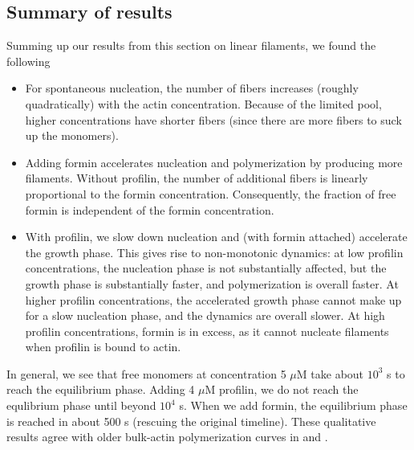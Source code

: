 \documentclass[11pt]{article}
\begin{document}
\iffalse
\begin{figure}
\centering
\texttt{[image: FreeMonConcForminLowProf.eps]}
\texttt{[image: FractionFreeForminLowProf.eps]}
\texttt{[image: PercentForminBoundLowProf.eps]}
\texttt{[image: FibersPerVolForminLowProf.eps]}
\caption{\label{fig:ActinForLowProf}Dynamics of actin polymerization (at 5 $\mu$M) with 0.1 nM formin and various profilin concentrations. Top left: the concentration of free actin monomers over time. The colors correspond to different formin concentrations. Top right: the fraction of free formins over time. Bottom left: the percentage of fibers that have a formin-bound barbed end. Bottom right: the number of fibers per unit volume. In addition to the colors representing different concentrations, the solid lines give the total density of filaments per volume, while the dotted lines give the density of formin-bound filaments.}
\end{figure}
\fi

\subsection{Summary of results}
Summing up our results from this section on linear filaments, we found the following
\begin{itemize}
\item For spontaneous nucleation, the number of fibers increases (roughly quadratically) with the actin concentration. Because of the limited pool, higher concentrations have shorter fibers (since there are more fibers to suck up the monomers).
\item Adding formin accelerates nucleation and polymerization by producing more filaments. Without profilin, the number of additional fibers is linearly proportional to the formin concentration. Consequently, the fraction of free formin is independent of the formin concentration. 
\item With profilin, we slow down nucleation and (with formin attached) accelerate the growth phase. This gives rise to non-monotonic dynamics: at low profilin concentrations, the nucleation phase is not substantially affected, but the growth phase is substantially faster, and polymerization is overall faster. At higher profilin concentrations, the accelerated growth phase cannot make up for a slow nucleation phase, and the dynamics are overall slower. At high profilin concentrations, formin is in excess, as it cannot nucleate filaments when profilin is bound to actin.
\end{itemize}
In general, we see that free monomers at concentration 5 $\mu$M take about $10^3$ s to reach the equilibrium phase. Adding 4 $\mu$M profilin, we do not reach the equlibrium phase until beyond $10^4$ s. When we add formin, the equilibrium phase is reached in about 500 s (rescuing the original timeline). These qualitative results agree with older bulk-actin polymerization curves in \cite[Fig.~2]{li2003mouse} and \cite[Fig.~6]{harris2004mouse}.
\end{document}
